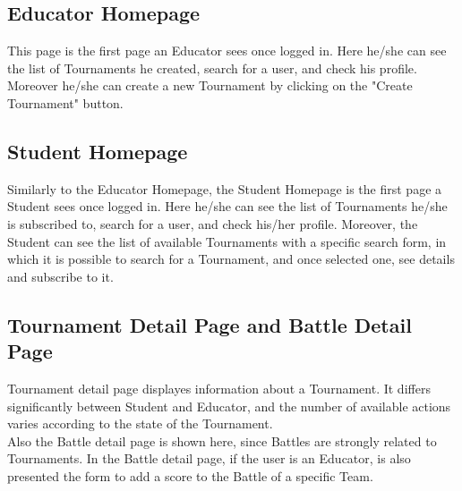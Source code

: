 \subsection{Educator Homepage}
This page is the first page an Educator sees once logged in. Here he/she can see the list of Tournaments he created, search for a user, and check his profile. Moreover he/she can create a new Tournament by clicking on the "Create Tournament" button.\\
\newpage
{}
\clearpage
\subsection{Student Homepage}
Similarly to the Educator Homepage, the Student Homepage is the first page a Student sees once logged in. Here he/she can see the list of Tournaments he/she is subscribed to, search for a user, and check his/her profile. Moreover, the Student can see the list of available Tournaments with a specific search form, in which it is possible to search for a Tournament, and once selected one, see details and subscribe to it.\\
\clearpage
\subsection{Tournament Detail Page and Battle Detail Page}
Tournament detail page displayes information about a Tournament. It differs significantly between Student and Educator, and the number of available actions varies according to the state of the Tournament.\\
Also the Battle detail page is shown here, since Battles are strongly related to Tournaments. In the Battle detail page, if the user is an Educator, is also presented the form to add a score to the Battle of a specific Team.\\
\clearpage
{}


